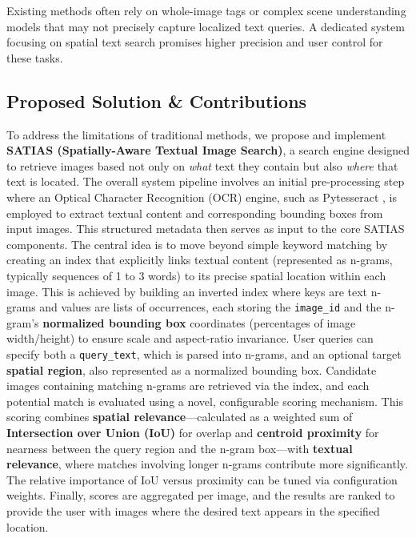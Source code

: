 \documentclass[sigconf,screen]{acmart}
\begin{document}
Existing methods often rely on whole-image tags or complex scene understanding models that may not precisely capture localized text queries. A dedicated system focusing on spatial text search promises higher precision and user control for these tasks.

\subsection{Proposed Solution \& Contributions}

To address the limitations of traditional methods, we propose and implement \textbf{SATIAS (Spatially-Aware Textual Image Search)}, a search engine designed to retrieve images based not only on \textit{what} text they contain but also \textit{where} that text is located. The overall system pipeline involves an initial pre-processing step where an Optical Character Recognition (OCR) engine, such as Pytesseract \cite{Smith2007AnOV}, is employed to extract textual content and corresponding bounding boxes from input images. This structured metadata then serves as input to the core SATIAS components. The central idea is to move beyond simple keyword matching by creating an index that explicitly links textual content (represented as n-grams, typically sequences of 1 to 3 words) to its precise spatial location within each image. This is achieved by building an inverted index where keys are text n-grams and values are lists of occurrences, each storing the \texttt{image\_id} and the n-gram's \textbf{normalized bounding box} coordinates (percentages of image width/height) to ensure scale and aspect-ratio invariance. User queries can specify both a \texttt{query\_text}, which is parsed into n-grams, and an optional target \textbf{spatial region}, also represented as a normalized bounding box. Candidate images containing matching n-grams are retrieved via the index, and each potential match is evaluated using a novel, configurable scoring mechanism. This scoring combines \textbf{spatial relevance}—calculated as a weighted sum of \textbf{Intersection over Union (IoU)} for overlap and \textbf{centroid proximity} for nearness between the query region and the n-gram box—with \textbf{textual relevance}, where matches involving longer n-grams contribute more significantly. The relative importance of IoU versus proximity can be tuned via configuration weights. Finally, scores are aggregated per image, and the results are ranked to provide the user with images where the desired text appears in the specified location.
\end{document}
